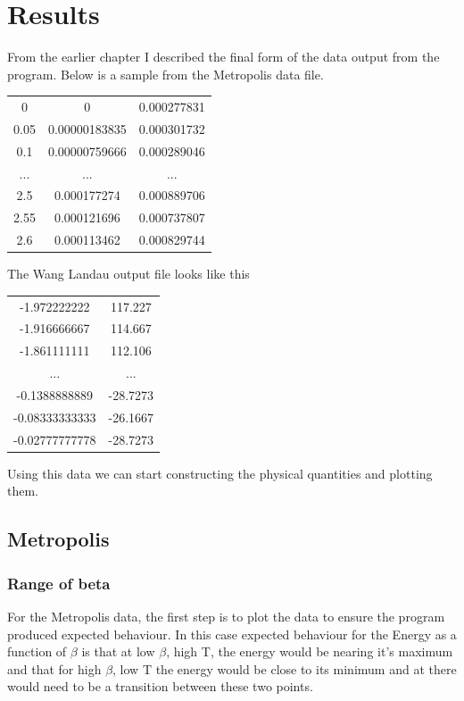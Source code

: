 \chapter{Results}
From the earlier chapter I described the final form of the data output from the program.
Below is a sample from the Metropolis data file.
\begin{table}[h]
\centering
\begin{tabular}{ccc}
0    & 0             & 0.000277831 \\
0.05 & 0.00000183835 & 0.000301732 \\
0.1  & 0.00000759666 & 0.000289046 \\
...  & ...           & ...         \\
2.5  & 0.000177274   & 0.000889706 \\
2.55 & 0.000121696   & 0.000737807 \\
2.6  & 0.000113462   & 0.000829744
\end{tabular}
\end{table}

The Wang Landau output file looks like this
\begin{table}[h]
\centering
\begin{tabular}{cc}
-1.972222222   & 117.227  \\
-1.916666667   & 114.667  \\
-1.861111111   & 112.106  \\
...            & ...      \\
-0.1388888889  & -28.7273 \\
-0.08333333333 & -26.1667 \\
-0.02777777778 & -28.7273
\end{tabular}
\end{table}

Using this data we can start constructing the physical quantities and plotting them.

\section{Metropolis}
\subsection{Range of beta}
For the Metropolis data, the first step is to plot the data to ensure the program produced expected behaviour.
In this case expected behaviour for the Energy as a function of $\beta$ is that at low $\beta$, high T, the energy would be nearing it's maximum and that for high $\beta$, low T the energy would be close to its minimum and at there would need to be a transition between these two points.

